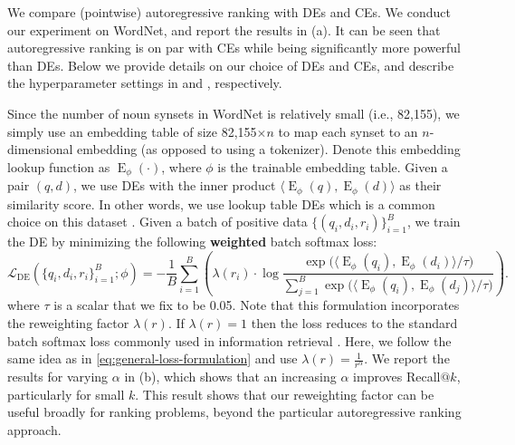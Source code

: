 \documentclass[11pt, a4paper, onecolumn, confidential, copyright, gdm]{google}
\begin{document}
We compare (pointwise) autoregressive ranking with DEs and CEs. We conduct our experiment on WordNet, and report the results in (a). It can be seen that autoregressive ranking is on par with CEs while being significantly more powerful than DEs. Below we provide details on our choice of DEs and CEs, and describe the hyperparameter settings in  and , respectively.

Since the number of noun synsets in WordNet is relatively small (i.e., 82,155), we simply use an embedding table of size 82,155$\times n$ to map each synset to an $n$-dimensional embedding (as opposed to using a tokenizer). 
Denote this embedding lookup function as $\operatorname{E}_\phi(\cdot)$, where $\phi$ is the trainable embedding table. 
Given a pair $(q, d)$, we use DEs with the inner product $\langle \operatorname{E}_\phi(q), \operatorname{E}_\phi(d) \rangle$ as their similarity score. In other words, we use lookup table DEs which is a common choice on this dataset \citep{dhingra2018embedding,parmar2022hyperbox,an2023coarse}.
Given a batch of positive data $\{(q_i, d_i, r_i)\}_{i=1}^B$, we train the DE by minimizing the following \textbf{weighted} batch softmax loss:
\begin{equation}
    \mathcal{L}_\text{DE}(\{q_i, d_i, r_i\}_{i=1}^B; \phi) = -\frac{1}{B} \sum_{i=1}^B 
    \left(
    \lambda(r_i) \cdot \log
    \frac{
        \exp{
            \Big(
                \langle \operatorname{E}_\phi(q_i), \operatorname{E}_\phi(d_i) \rangle / \tau
            \Big)
        }
    }
    {
        \sum_{j=1}^B 
        \exp{
            \Big(
                \langle \operatorname{E}_\phi(q_i), \operatorname{E}_\phi(d_j) \rangle / \tau
            \Big)
        }
    }
    \right).
\end{equation}
where $\tau$ is a scalar that we fix to be 0.05. Note that this formulation incorporates the reweighting factor $\lambda(r)$.
If $\lambda(r) = 1$ then the loss reduces to the standard batch softmax loss commonly used in information retrieval \citep{wu2024effectiveness}. 
Here, we follow the same idea as in \eqref{eq:general-loss-formulation} and use $\lambda(r)=\frac{1}{r^\alpha}$. 
We report the results for varying $\alpha$ in (b), which shows that an increasing $\alpha$ improves Recall$@k$, particularly for small $k$. 
This result shows that our reweighting factor can be useful broadly for ranking problems, beyond the particular autoregressive ranking approach. 
\end{document}
